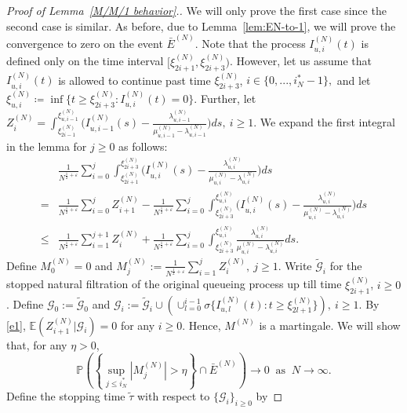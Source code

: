 \documentclass[11pt, reqno]{article}
\numberwithin{equation}{section}
\numberwithin{theorem}{section}
\begin{document}
\begin{appendix}
\begin{proof}[Proof of Lemma~\ref{M/M/1 behavior}.]
We will only prove the first case since the second case is similar. 
As before, due to Lemma~\ref{lem:EN-to-1}, we will prove the convergence to zero on the event $\bar{E}^{(N)}$.
Note that the process $I^{(N)}_{u,i}(t)$ is defined only on the time interval $[\xi^{(N)}_{2i+1}, \xi^{(N)}_{2i+3})$.
However, let us assume that $I^{(N)}_{u,i}(t)$ is allowed to continue past time $\xi^{(N)}_{2i+3}$, $i\in \{0,...,i^*_N-1\},$ and let $\xi^{(N)}_{u,i}\coloneqq\inf \{t\geq \xi^{(N)}_{2i+3}: I^{(N)}_{u,i}(t)=0\}$.
Further, let 
$
Z^{(N)}_i=\int_{\xi^{(N)}_{2i-1}}^{\xi^{(N)}_{u,i-1}}\Big(I^{(N)}_{u,i-1}(s)-\frac{\lambda^{(N)}_{u,i-1}}{\mu^{(N)}_{u,i-1}-\lambda^{(N)}_{u,i-1}}\Big)ds, \ i \ge 1.
$
We expand the first integral in the lemma for $j \ge 0$ as follows:
\begin{align}\label{eq:lemmaA7-1}
    &\frac{1}{N^{\frac{1}{2}+\varepsilon}}\sum_{i=0}^j\int_{\xi^{(N)}_{2i+1}}^{\xi^{(N)}_{2i+3}}\Big(I^{(N)}_{u,i}(s)-\frac{\lambda^{(N)}_{u,i}}{\mu^{(N)}_{u,i}-\lambda^{(N)}_{u,i}}\Big)ds\nonumber\\
    =&\frac{1}{N^{\frac{1}{2}+\varepsilon}}\sum_{i=0}^{j}Z^{(N)}_{i+1}-\frac{1}{N^{\frac{1}{2}+\varepsilon}}\sum_{i=0}^{j}\int_{\xi^{(N)}_{2i+3}}^{\xi^{(N)}_{u,i}}\Big(I^{(N)}_{u,i}(s)-\frac{\lambda^{(N)}_{u,i}}{\mu^{(N)}_{u,i}-\lambda^{(N)}_{u,i}}\Big)ds\nonumber\\
    \leq& \frac{1}{N^{\frac{1}{2}+\varepsilon}}\sum_{i=1}^{j+1}Z^{(N)}_{i}+\frac{1}{N^{\frac{1}{2}+\varepsilon}}\sum_{i=0}^{j}\int_{\xi^{(N)}_{2i+3}}^{\xi^{(N)}_{u,i}}\frac{\lambda^{(N)}_{u,i}}{\mu^{(N)}_{u,i}-\lambda^{(N)}_{u,i}}ds.
\end{align}
Define $M^{(N)}_0=0$ and
$
   M^{(N)}_j := \frac{1}{N^{\frac{1}{2}+\varepsilon}}\sum_{i=1}^{j}Z^{(N)}_{i}, \ j \ge 1.
$
Write $\tilde{\mathcal{G}}_i$ for the stopped natural filtration of the original queueing process up till time $\xi^{(N)}_{2i+1}$, $i \ge 0$. Define $\mathcal{G}_0 := \tilde{\mathcal{G}}_0$ and
$
\mathcal{G}_i := \tilde{\mathcal{G}}_i \cup \left(\cup_{l=0}^{i-1}\sigma \{I^{(N)}_{u,l}(t) : t \ge \xi^{(N)}_{2l+1}\}\right), \ i \ge 1.
$
By \eqref{e1}, $\mathbb{E}\left(Z^{(N)}_{i+1} \vert \mathcal{G}_{i}\right) = 0$ for any $i \ge 0$. Hence, $M^{(N)}$ is a martingale. 
We will show that, for any $\eta>0$,
\begin{equation}\label{ptozeromart}
\mathbb{P}\left(\left\lbrace \sup_{j \le i^*_N} \left|M^{(N)}_j\right|  > \eta \right\rbrace \cap \bar{E}^{(N)}\right) \rightarrow 0 \ \text{ as } \ N \rightarrow \infty.
\end{equation}
Define the stopping time $\tilde \tau$ with respect to $\{\mathcal{G}_i\}_{i \ge 0}$ by

\end{proof}
\end{appendix}
\end{document}
